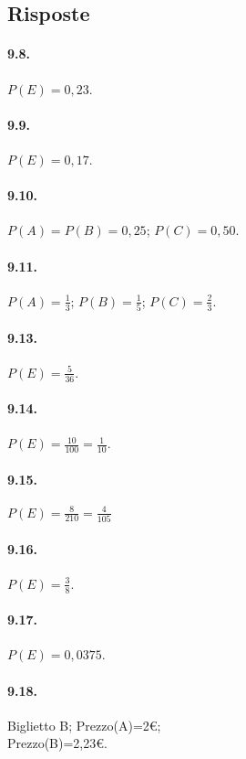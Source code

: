 \subsection{Risposte}
\begin{multicols}{2}

\paragraph{9.8.} $P(E)=0,23$.

\paragraph{9.9.} $P(E)=0,17$.

\paragraph{9.10.} $P(A)=P(B)=0,25$; $P(C)=0,50$.

\paragraph{9.11.} $ P(A)=\frac{1}{3}$; $P(B)=\frac{1}{5}$; $P(C)=\frac{2}{3} $.

\paragraph{9.13.} $P(E)=\frac 5{36}$.

\paragraph{9.14.} $P(E)=\frac{10}{100}=\frac 1{10}$.

\paragraph{9.15.} $P(E)=\frac 8{210}=\frac 4{105}$

\paragraph{9.16.} $P(E)=\frac 3 8$.

\paragraph{9.17.} $P(E)=0,0375$.

\paragraph{9.18.} Biglietto B; Prezzo(A)=2€;\protect\\ Prezzo(B)=2,23€.


\end{multicols}
